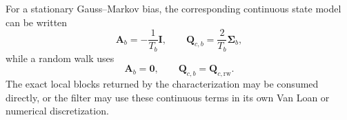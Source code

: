 \documentclass[11pt,oneside,headings=big]{scrreprt}
\newcommand{\mat}[1]{\bm{#1}}
\begin{document}
    For a stationary Gauss--Markov bias, the corresponding continuous state model
    can be written
    \begin{equation}
        \mat A_b=-\frac{1}{T_b}\mat I,
        \qquad
        \mat Q_{c,b}=\frac{2}{T_b}\mat\Sigma_b,
        \label{eq:characterization-gm-continuous}
    \end{equation}
    while a random walk uses
    \begin{equation}
        \mat A_b=\mat0,
        \qquad
        \mat Q_{c,b}=\mat Q_{c,\mathrm{rw}}.
        \label{eq:characterization-rw-continuous}
    \end{equation}
    The exact local blocks returned by the characterization may be consumed
    directly, or the filter may use these continuous terms in its own Van Loan or
    numerical discretization.
\end{document}

